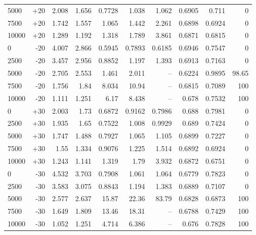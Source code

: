 {\begin{longtable}{@{}lrrrrrrrrr@{}}
5000 & +20 & 2.008 & 1.656 & 0.7728 & 1.038 & 1.062 & 0.6905 & 0.711 & 0\\
7500 & +20 & 1.742 & 1.557 & 1.065 & 1.442 & 2.261 & 0.6898 & 0.6924 & 0\\
10000 & +20 & 1.289 & 1.192 & 1.318 & 1.789 & 3.861 & 0.6871 & 0.6815 & 0\\
0 & -20 & 4.007 & 2.866 & 0.5945 & 0.7893 & 0.6185 & 0.6946 & 0.7547 & 0\\
2500 & -20 & 3.457 & 2.956 & 0.8852 & 1.197 & 1.393 & 0.6913 & 0.7163 & 0\\
5000 & -20 & 2.705 & 2.553 & 1.461 & 2.011 & -- & 0.6224 & 0.9895 & 98.65\\
7500 & -20 & 1.756 & 1.84 & 8.034 & 10.94 & -- & 0.6815 & 0.7089 & 100\\
10000 & -20 & 1.111 & 1.251 & 6.17 & 8.438 & -- & 0.678 & 0.7532 & 100\\
0 & +30 & 2.003 & 1.73 & 0.6872 & 0.9162 & 0.7986 & 0.688 & 0.7981 & 0\\
2500 & +30 & 1.935 & 1.65 & 0.7522 & 1.008 & 0.9929 & 0.689 & 0.7424 & 0\\
5000 & +30 & 1.747 & 1.488 & 0.7927 & 1.065 & 1.105 & 0.6899 & 0.7227 & 0\\
7500 & +30 & 1.55 & 1.334 & 0.9076 & 1.225 & 1.514 & 0.6892 & 0.6924 & 0\\
10000 & +30 & 1.243 & 1.141 & 1.319 & 1.79 & 3.932 & 0.6872 & 0.6751 & 0\\
0 & -30 & 4.532 & 3.703 & 0.7908 & 1.061 & 1.064 & 0.6779 & 0.7823 & 0\\
2500 & -30 & 3.583 & 3.075 & 0.8843 & 1.194 & 1.383 & 0.6889 & 0.7107 & 0\\
5000 & -30 & 2.577 & 2.637 & 15.87 & 22.36 & 83.79 & 0.6828 & 0.6873 & 100\\
7500 & -30 & 1.649 & 1.809 & 13.46 & 18.31 & -- & 0.6788 & 0.7429 & 100\\
10000 & -30 & 1.052 & 1.251 & 4.714 & 6.386 & -- & 0.676 & 0.7828 & 100\\\end{longtable}}